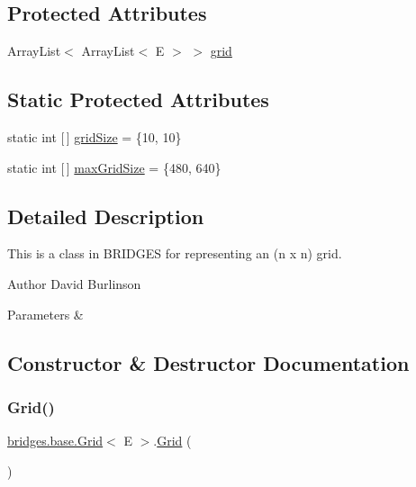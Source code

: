 \subsection*{Protected Attributes}
\begin{DoxyCompactItemize}
\item 
Array\+List$<$ Array\+List$<$ E $>$ $>$ \mbox{\hyperlink{classbridges_1_1base_1_1_grid_ad1f3f6968d58188425bd992c05c655a6}{grid}}
\end{DoxyCompactItemize}
\subsection*{Static Protected Attributes}
\begin{DoxyCompactItemize}
\item 
static int \mbox{[}$\,$\mbox{]} \mbox{\hyperlink{classbridges_1_1base_1_1_grid_a54a66479f78022570253d771206a0420}{grid\+Size}} = \{10, 10\}
\item 
static int \mbox{[}$\,$\mbox{]} \mbox{\hyperlink{classbridges_1_1base_1_1_grid_a803fd4c070a22863c82581f0bb258c1c}{max\+Grid\+Size}} = \{480, 640\}
\end{DoxyCompactItemize}


\subsection{Detailed Description}
This is a class in B\+R\+I\+D\+G\+ES for representing an (n x n) grid. 

\begin{DoxyAuthor}{Author}
David Burlinson 
\end{DoxyAuthor}

\begin{DoxyParams}{Parameters}
{\em } & \\
\hline
\end{DoxyParams}


\subsection{Constructor \& Destructor Documentation}
\mbox{\label{classbridges_1_1base_1_1_grid_aa621ffc958db8341f7ce37ed78944d51}} 
\subsubsection{\texorpdfstring{Grid()}{Grid()}\hspace{0.1cm}{\footnotesize\ttfamily [1/4]}}
{\footnotesize\ttfamily \mbox{\hyperlink{classbridges_1_1base_1_1_grid}{bridges.\+base.\+Grid}}$<$ E $>$.\mbox{\hyperlink{classbridges_1_1base_1_1_grid}{Grid}} (\begin{DoxyParamCaption}{ }\end{DoxyParamCaption})}

